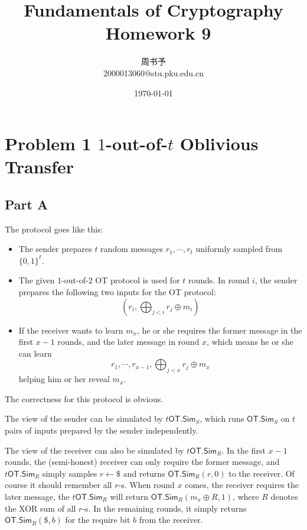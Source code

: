 \documentclass[8pt]{article}
\title{\heiti\zihao{1} Fundamentals  of Cryptography \ Homework 9}
\author{\kaishu\zihao{-3} 周书予\\2000013060@stu.pku.edu.cn}
\date{\today}
\theoremstyle{compact}
\def\Pr#1{\text{Pr}\left[{#1}\right]}
\def\Enc{\textsf{Enc}}
\def\Dec{\textsf{Dec}}
\def\Gen{\textsf{Gen}}
\begin{document}
\large
{}
\pagestyle{plain}



\maketitle

\def\Gen{\textsf{Gen}}
\def\Enc{\textsf{Enc}}
\def\Dec{\textsf{Dec}}
\def\Sign{\textsf{Sign}}
\def\Verify{\textsf{Verify}}
\def\Pr{\text{Pr}}
\def\poly{\text{poly}}
\def\Agg{\textsf{Aggregate}}


\section*{Problem 1 $1$-out-of-$t$ Oblivious Transfer}
\subsection*{Part A}

The protocol goes like this: \begin{itemize}
	\item The sender prepares $t$ random messages $r_1, \cdots, r_t$ uniformly sampled from $\{0, 1\}^{\ell}$.
	\item The given $1$-out-of-$2$ OT protocol is used for $t$ rounds. In round $i$, the sender prepares the following two inputs for the OT protocol: $$(r_i, \bigoplus_{j < i}r_j \oplus m_i)$$
	\item If the receiver wants to learn $m_x$, he or she requires the former message in the first $x-1$ rounds, and the later message in round $x$, which means he or she can learn $$r_1, \cdots, r_{x-1}, \bigoplus_{j < x}r_j \oplus m_x$$ helping him or her reveal $m_x$.
\end{itemize}

The correctness for this protocol is obvious.

The view of the sender can be simulated by $t\textsf{OT.Sim}_S$, which runs $\textsf{OT.Sim}_S$ on $t$ pairs of inputs prepared by the sender independently.

The view of the receiver can also be simulated by $t\textsf{OT.Sim}_R$. In the first $x-1$ rounds, the (semi-honest) receiver can only require the former message, and $t\textsf{OT.Sim}_R$ simply samples $r \gets \$$ and returns $\textsf{OT.Sim}_R(r, 0)$ to the receiver. Of course it should remember all $r$-s. When round $x$ comes, the receiver requires the later message, the $t\textsf{OT.Sim}_R$ will return $\textsf{OT.Sim}_R(m_x \oplus R, 1)$, where $R$ denotes the XOR sum of all $r$-s. In the remaining rounds, it simply returns $\textsf{OT.Sim}_R(\$, b)$ for the require bit $b$ from the receiver.
\end{document}
